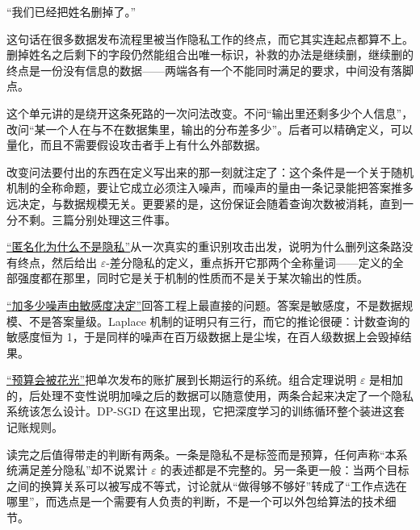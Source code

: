 ``我们已经把姓名删掉了。''

这句话在很多数据发布流程里被当作隐私工作的终点，而它其实连起点都算不上。删掉姓名之后剩下的字段仍然能组合出唯一标识，补救的办法是继续删，继续删的终点是一份没有信息的数据——两端各有一个不能同时满足的要求，中间没有落脚点。

这个单元讲的是绕开这条死路的一次问法改变。不问``输出里还剩多少个人信息''，改问``某一个人在与不在数据集里，输出的分布差多少''。后者可以精确定义，可以量化，而且不需要假设攻击者手上有什么外部数据。

改变问法要付出的东西在定义写出来的那一刻就注定了：这个条件是一个关于随机机制的全称命题，要让它成立必须注入噪声，而噪声的量由一条记录能把答案推多远决定，与数据规模无关。更要紧的是，这份保证会随着查询次数被消耗，直到一分不剩。三篇分别处理这三件事。

\hyperref[sec:17-Constrained-Guarantees/01-Differential-Privacy/01]{``匿名化为什么不是隐私''}从一次真实的重识别攻击出发，说明为什么删列这条路没有终点，然后给出 \(\varepsilon\)-差分隐私的定义，重点拆开它那两个全称量词——定义的全部强度都在那里，同时它是关于机制的性质而不是关于某次输出的性质。

\hyperref[sec:17-Constrained-Guarantees/01-Differential-Privacy/02]{``加多少噪声由敏感度决定''}回答工程上最直接的问题。答案是敏感度，不是数据规模、不是答案量级。Laplace 机制的证明只有三行，而它的推论很硬：计数查询的敏感度恒为 1，于是同样的噪声在百万级数据上是尘埃，在百人级数据上会毁掉结果。

\hyperref[sec:17-Constrained-Guarantees/01-Differential-Privacy/03]{``预算会被花光''}把单次发布的账扩展到长期运行的系统。组合定理说明 \(\varepsilon\) 是相加的，后处理不变性说明加噪之后的数据可以随意使用，两条合起来决定了一个隐私系统该怎么设计。DP-SGD 在这里出现，它把深度学习的训练循环整个装进这套记账规则。

读完之后值得带走的判断有两条。一条是隐私不是标签而是预算，任何声称``本系统满足差分隐私''却不说累计 \(\varepsilon\) 的表述都是不完整的。另一条更一般：当两个目标之间的换算关系可以被写成不等式，讨论就从``做得够不够好''转成了``工作点选在哪里''，而选点是一个需要有人负责的判断，不是一个可以外包给算法的技术细节。
